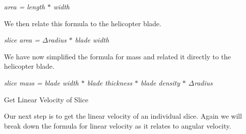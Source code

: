 \documentclass[a4paper, 11pt, oneside]{book} %
\begin{document}
\vspace{0.5\baselineskip} %
\vspace{0.5\baselineskip} %

\textit{area = length $*$ width}\\

\vspace{0.5\baselineskip} %
\vspace{0.5\baselineskip} %

We then relate this formula to the helicopter blade.\\

\vspace{0.5\baselineskip} %
\vspace{0.5\baselineskip} %

\textit{slice area = $\Delta$radius $*$ blade width}\\

\vspace{0.5\baselineskip} %
\vspace{0.5\baselineskip} %

We have now simplified the formula for mass and related it directly to the helicopter blade.\\

\vspace{0.5\baselineskip} %
\vspace{0.5\baselineskip} %

\textit{slice mass = blade width $*$ blade thickness $*$ blade density $*$ $\Delta$radius}\\

\vspace{0.5\baselineskip} %
\vspace{0.5\baselineskip} %

{\LARGE Get Linear Velocity of Slice \\} %
\vspace{0.5\baselineskip} %
\vspace{0.5\baselineskip} %

Our next step is to get the linear velocity of an individual slice. Again we will break down the formula for linear velocity as it relates to angular velocity.\\
\end{document}
